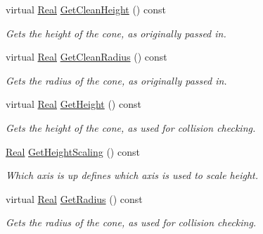 \begin{DoxyCompactItemize}
\item 
virtual \hyperlink{namespaceMezzanine_a726731b1a7df72bf3583e4a97282c6f6}{Real} \hyperlink{classMezzanine_1_1ConeCollisionShape_af52995ed04491df5ebbff26af6ecd816}{GetCleanHeight} () const 
\begin{DoxyCompactList}\small\item\em Gets the height of the cone, as originally passed in. \item\end{DoxyCompactList}\item 
virtual \hyperlink{namespaceMezzanine_a726731b1a7df72bf3583e4a97282c6f6}{Real} \hyperlink{classMezzanine_1_1ConeCollisionShape_a24b59bbca0455e54cf7bb692ff46c080}{GetCleanRadius} () const 
\begin{DoxyCompactList}\small\item\em Gets the radius of the cone, as originally passed in. \item\end{DoxyCompactList}\item 
virtual \hyperlink{namespaceMezzanine_a726731b1a7df72bf3583e4a97282c6f6}{Real} \hyperlink{classMezzanine_1_1ConeCollisionShape_a6247f2a72e298ada975a0fa840b12629}{GetHeight} () const 
\begin{DoxyCompactList}\small\item\em Gets the height of the cone, as used for collision checking. \item\end{DoxyCompactList}\item 
\hyperlink{namespaceMezzanine_a726731b1a7df72bf3583e4a97282c6f6}{Real} \hyperlink{classMezzanine_1_1ConeCollisionShape_aa3c48e845cb96783118d2cb9562246a9}{GetHeightScaling} () const 
\begin{DoxyCompactList}\small\item\em Which axis is up defines which axis is used to scale height. \item\end{DoxyCompactList}\item 
virtual \hyperlink{namespaceMezzanine_a726731b1a7df72bf3583e4a97282c6f6}{Real} \hyperlink{classMezzanine_1_1ConeCollisionShape_ae2d8ed139802999b4bec4fdac4814ef3}{GetRadius} () const 
\begin{DoxyCompactList}\small\item\em Gets the radius of the cone, as used for collision checking. \item\end{DoxyCompactList}\item 

\end{DoxyCompactItemize}
